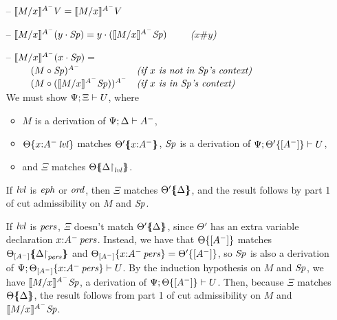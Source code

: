 \begin{itemize}
\item[--] $\rsubsta{M}{x}{\tfocusr{V}}{A^-} 
           = \tfocusr{\rsubsta{M}{x}{V}{A^-}}$
\item[--] $\rsubsta{M}{x}{(\tfocusl{y}{\Sp})}{A^-} 
           = \tfocusl{y}{(\rsubsta{M}{x}{\Sp}{A^-})} \qquad$ {\it ($x \# y$)}
\item[--] $\rsubsta{M}{x}{(\tfocusl{x}{\Sp})}{A^-} =$\\
    $\begin{array}{ll}
    \qquad (\subst{M}{\Sp})^{A^-}
     & \mbox{\it (if $x$ is not in $\Sp$'s context)}\\
    \qquad (\subst{M}{(\rsubsta{M}{x}{\Sp}{A^-})})^{A^-}
     & \mbox{\it (if $x$ is in $\Sp$'s context)}
    \end{array}$\smallskip\\
  We must show $\foc{\Psi}{\Xi}{U}$, where
  \begin{itemize}
  \item $M$ is a derivation of $\foc{\Psi}{\Delta}{A^-}$, 
  \item $\tackon{\Theta}{x{:}\islvl{A^-}}$ matches
     $\frameoff{\Theta'}{x{:}A^-}$, 
     $\Sp$ is a derivation of 
     $\foc{\Psi}{\tackon{\Theta'}{[A^-]}}{U}$,
  \item and $\Xi$ matches $\frameoff{\Theta}{\restrictto{\Delta}{\mlvl}}$.
  \end{itemize}
  If $\mlvl$ is $\meph$ or $\mtrue$, then 
  $\Xi$ matches $\frameoff{\Theta'}{\Delta}$, and the result follows by
  part 1 of cut admissibility on $M$ and $\Sp$. 

  If $\mlvl$ is $\mpers$, $\Xi$ doesn't match $\frameoff{\Theta'}{\Delta}$,
  since $\Theta'$ has an extra variable declaration $x{:}\ispers{A^-}$. Instead,
  we have that 
    $\tackon{\Theta}{[A^-]}$ matches 
   $\frameoff{\Theta_{[A^-]}}{\restrictto{\Delta}{\mpers}}$
  and $\tackon{\Theta_{[A^-]}}{x{:}\ispers{A^-}} = \tackon{\Theta'}{[A^-]}$,
  so $\Sp$ is also a derivation of 
  $\foc{\Psi}{\tackon{\Theta_{[A^-]}}{x{:}\ispers{A^-}}}{U}$. 
  By the induction hypothesis on $M$ and $\Sp$, we have 
  $\rsubsta{M}{x}{\Sp}{A^-}$, a derivation of 
  $\foc{\Psi}{\tackon{\Theta}{[A^-]}}{U}$. Then, because
  $\Xi$ matches $\frameoff{\Theta}{\Delta}$, the result follows
  from part 1 of cut admissibility on $M$ and $\rsubsta{M}{x}{\Sp}{A^-}$.
  
 


\end{itemize}
